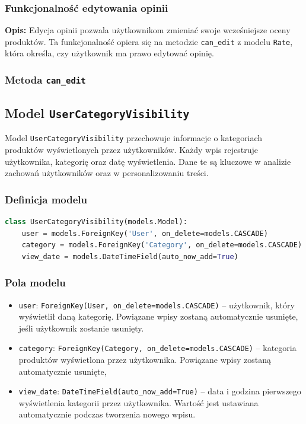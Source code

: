 \documentclass[12pt,a4paper,oneside]{article}
\theoremstyle{definition}
\numberwithin{equation}{section}
\begin{document}
\subsubsection{Funkcjonalność edytowania opinii}

\textbf{Opis:}  
Edycja opinii pozwala użytkownikom zmieniać swoje wcześniejsze oceny produktów. Ta funkcjonalność opiera się na metodzie \texttt{can\_edit} z modelu \texttt{Rate}, która określa, czy użytkownik ma prawo edytować opinię.

\subsubsection*{Metoda \texttt{can\_edit}}


% 
% 
\clearpage
\subsection{Model \texttt{UserCategoryVisibility}}

Model \texttt{UserCategoryVisibility} przechowuje informacje o kategoriach produktów wyświetlonych przez użytkowników. Każdy wpis rejestruje użytkownika, kategorię oraz datę wyświetlenia. Dane te są kluczowe w analizie zachowań użytkowników oraz w personalizowaniu treści.

\subsubsection{Definicja modelu}
\begin{lstlisting}[language=Python, caption={\texttt{UserCategoryVisibility}}]
class UserCategoryVisibility(models.Model):
    user = models.ForeignKey('User', on_delete=models.CASCADE)
    category = models.ForeignKey('Category', on_delete=models.CASCADE)
    view_date = models.DateTimeField(auto_now_add=True)
\end{lstlisting}

\subsubsection{Pola modelu}
\begin{itemize}
    \item \texttt{user}: \texttt{ForeignKey(User, on\_delete=models.CASCADE)} – użytkownik, który wyświetlił daną kategorię. Powiązane wpisy zostaną automatycznie usunięte, jeśli użytkownik zostanie usunięty.
    \item \texttt{category}: \texttt{ForeignKey(Category, on\_delete=models.CASCADE)} – kategoria produktów wyświetlona przez użytkownika. Powiązane wpisy zostaną automatycznie usunięte,
    \item \texttt{view\_date}: \texttt{DateTimeField(auto\_now\_add=True)} – data i godzina pierwszego wyświetlenia kategorii przez użytkownika. Wartość jest ustawiana automatycznie podczas tworzenia nowego wpisu.
\end{itemize}
\end{document}
